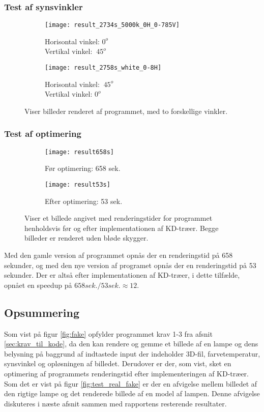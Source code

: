\subsubsection{Test af synsvinkler}
\begin{figure}[H]
\centering
\begin{subfigure}{.5\textwidth}
  \centering
  \texttt{[image: result\_2734s\_5000k\_0H\_0-785V]}
  \caption{Horisontal vinkel: $0^o$ \\ Vertikal vinkel: $~45^o$}
  \label{fig:one}
\end{subfigure}%
\begin{subfigure}{.5\textwidth}
  \centering
  \texttt{[image: result\_2758s\_white\_0-8H]}
  \caption{Horisontal vinkel: $~45^o$ \\ Vertikal vinkel: $0^o$}
  \label{fig:two}
\end{subfigure}
\caption{Viser billeder renderet af programmet, med to forskellige vinkler.}
\label{fig:synsvinkel}
\end{figure}

\subsubsection{Test af optimering}
\begin{figure}[H]
\centering
\begin{subfigure}{.5\textwidth}
  \centering
  \texttt{[image: result658s]}
  \caption{Før optimering: 658 sek.}
  \label{fig:slow}
\end{subfigure}%
\begin{subfigure}{.5\textwidth}
  \centering
  \texttt{[image: result53s]}
  \caption{Efter optimering: 53 sek.}
  \label{fig:fast}
\end{subfigure}
\caption{Viser et billede angivet med renderingstider for programmet henholdsvis før og efter implementationen af KD-træer. Begge billeder er renderet uden bløde skygger.}
\label{fig:optimering}
\end{figure}

Med den gamle version af programmet opnås der en renderingstid på 658 sekunder, og med den nye version af programet opnås der en renderingstid på 53 sekunder. Der er altså efter implementationen af KD-træer, i dette tilfælde, opnået en speedup på $658 sek./53 sek. \approx 12$.

\subsection*{Opsummering}
Som vist på figur \ref{fig:fake} opfylder programmet krav 1-3 fra afsnit \ref{sec:krav_til_kode}, da den kan rendere og gemme et billede af en lampe og dens belysning på baggrund af indtastede input der indeholder 3D-fil, farvetemperatur, synsvinkel og opløsningen af billedet. Derudover er der, som vist, sket en optimering af programmets renderingstid efter implementeringen af KD-træer. 
Som det er vist på figur \ref{fig:test_real_fake} er der en afvigelse mellem billedet af den rigtige lampe og det renderede billede af en model af lampen. Denne afvigelse diskuteres i næste afsnit sammen med rapportens resterende resultater. 

